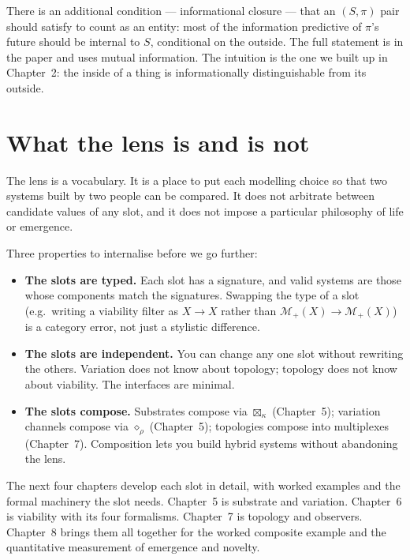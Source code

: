 There is an additional condition --- informational closure --- that an
$(S, \pi)$ pair should satisfy to count as an entity: most of the
information predictive of $\pi$'s future should be internal to $S$,
conditional on the outside. The full statement is in the paper and uses
mutual information. The intuition is the one we built up in Chapter~2:
the inside of a thing is informationally distinguishable from its
outside.

\section{What the lens is and is not}

The lens is a vocabulary. It is a place to put each modelling choice so
that two systems built by two people can be compared. It does not
arbitrate between candidate values of any slot, and it does not impose
a particular philosophy of life or emergence.

Three properties to internalise before we go further:

\begin{itemize}[leftmargin=1.5em,itemsep=2pt]
  \item \textbf{The slots are typed.} Each slot has a signature, and
    valid systems are those whose components match the signatures.
    Swapping the type of a slot (e.g.\ writing a viability filter as
    $X \to X$ rather than $\mathcal{M}_+(X) \to \mathcal{M}_+(X)$) is a
    category error, not just a stylistic difference.
  \item \textbf{The slots are independent.} You can change any one slot
    without rewriting the others. Variation does not know about
    topology; topology does not know about viability. The interfaces
    are minimal.
  \item \textbf{The slots compose.} Substrates compose via
    $\boxtimes_\kappa$ (Chapter~5); variation channels compose via
    $\diamond_\rho$ (Chapter~5); topologies compose into multiplexes
    (Chapter~7). Composition lets you build hybrid systems without
    abandoning the lens.
\end{itemize}

The next four chapters develop each slot in detail, with worked
examples and the formal machinery the slot needs. Chapter~5 is
substrate and variation. Chapter~6 is viability with its four
formalisms. Chapter~7 is topology and observers. Chapter~8 brings them
all together for the worked composite example and the quantitative
measurement of emergence and novelty.

